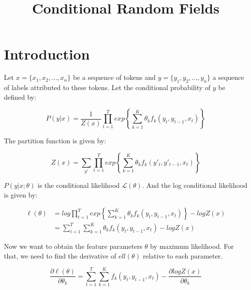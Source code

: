 \documentclass{article}
\begin{document}
\title{Conditional Random Fields}

\maketitle


\section{Introduction}

Let $ x = \{x_1, x_2, ..., x_n \} $ be a sequence of tokens and $ y = \{y_1, y_2, ..., y_n \} $ 
a sequence of labels attributed to these tokens. Let the conditional probability of $ y $ be 
defined by:

\begin{equation}
P(y|x) = \frac{1}{Z(x)} \prod_{t=1}^{T}exp\left\{\sum_{k=1}^{K} \theta_k f_k(y_t, y_{t-1}, x_t)\right\}
\label{eq:1}
\end{equation}

The partition function is given by:

\begin{equation}
Z(x) = \sum_{y'}\prod_{t=1}^{T}exp\left\{\sum_{k=1}^{K} \theta_k f_k(y'_t, y'_{t-1}, x_t)\right\}
\label{eq:2}
\end{equation}

$ P(y|x; \theta) $ is the conditional likelihood $ \mathcal{L}(\theta) $. And the log conditional likelihood
is given by:

\begin{equation}
\begin{split}
\ell(\theta) & = log \prod_{t=1}^{T}exp\left\{\sum_{k=1}^{K} \theta_k f_k(y_t, y_{t-1}, x_t)\right\} - log Z(x) \\
             & = \sum_{t=1}^{T}\sum_{k=1}^{K} \theta_k f_k(y_t, y_{t-1}, x_t) - log Z(x)
\end{split}
\label{eq:3}
\end{equation}

Now we want to obtain the feature parameters $ \theta $ by maximum likelihood. For that, we need to find the
derivative of $ ell(\theta) $ relative to each parameter.

\begin{equation}
\frac{\partial \ell(\theta)}{\partial \theta_k} = \sum_{t=1}^{T}\sum_{k=1}^{K} f_k(y_t, y_{t-1}, x_t) - \frac{\partial log Z(x)}{\partial \theta_k}
\label{eq:4}
\end{equation}
\end{document}
